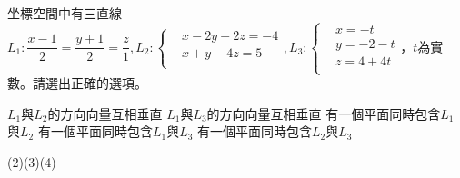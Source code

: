 \begin{QUESTION}
    \begin{QBODY}
        坐標空間中有三直線${{L}_{1}}:\dfrac{x-1}{2}=\dfrac{y+1}{2}=\dfrac{z}{1},{{L}_{2}}:\left\{ \begin{aligned}
        & x-2y+2z=-4 \\ 
        & x+y-4z=5 \\ 
        \end{aligned} \right.,{{L}_{3}}:\left\{ \begin{aligned}
        & x=-t \\ 
        & y=-2-t \\ 
        & z=4+4t \\ 
        \end{aligned} \right.$，$t$為實數。請選出正確的選項。
        \begin{QOPS}
            \QOP ${{L}_{1}}$與${{L}_{2}}$的方向向量互相垂直
            \QOP ${{L}_{1}}$與${{L}_{3}}$的方向向量互相垂直
            \QOP 有一個平面同時包含${{L}_{1}}$與${{L}_{2}}$
            \QOP 有一個平面同時包含${{L}_{1}}$與${{L}_{3}}$
            \QOP 有一個平面同時包含${{L}_{2}}$與${{L}_{3}}$
        \end{QOPS}
    \end{QBODY}
    \begin{QFROMS}
    \end{QFROMS}
    \begin{QTAGS}
    \end{QTAGS}
    \begin{QANS}
        (2)(3)(4)
    \end{QANS}
    \begin{QSOL}
    \end{QSOL}
    \begin{QEMPTYSPACE}
    \end{QEMPTYSPACE}
\end{QUESTION}
